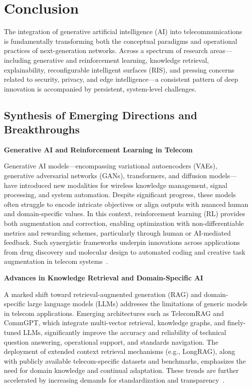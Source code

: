 \section{Conclusion}

The integration of generative artificial intelligence (AI) into telecommunications is fundamentally transforming both the conceptual paradigms and operational practices of next-generation networks. Across a spectrum of research areas—including generative and reinforcement learning, knowledge retrieval, explainability, reconfigurable intelligent surfaces (RIS), and pressing concerns related to security, privacy, and edge intelligence—a consistent pattern of deep innovation is accompanied by persistent, system-level challenges.

\subsection{Synthesis of Emerging Directions and Breakthroughs}

\textbf{Generative AI and Reinforcement Learning in Telecom}

Generative AI models—encompassing variational autoencoders (VAEs), generative adversarial networks (GANs), transformers, and diffusion models—have introduced new modalities for wireless knowledge management, signal processing, and system automation. Despite significant progress, these models often struggle to encode intricate objectives or align outputs with nuanced human and domain-specific values. In this context, reinforcement learning (RL) provides both augmentation and correction, enabling optimization with non-differentiable metrics and rewarding schemes, particularly through human or AI-mediated feedback. Such synergistic frameworks underpin innovations across applications from drug discovery and molecular design to automated coding and creative task augmentation in telecom systems~\cite{ref1, ref2, ref3, ref4, ref5, ref6}.

\textbf{Advances in Knowledge Retrieval and Domain-Specific AI}

A marked shift toward retrieval-augmented generation (RAG) and domain-specific large language models (LLMs) addresses the limitations of generic models in telecom applications. Emerging architectures such as TelecomRAG and CommGPT, which integrate multi-vector retrieval, knowledge graphs, and finely-tuned LLMs, significantly improve the accuracy and reliability of technical question answering, operational support, and standards navigation. The deployment of extended context retrieval mechanisms (e.g., LongRAG), along with publicly available telecom-specific datasets and benchmarks, emphasizes the need for domain knowledge and continual adaptation. These trends are further accelerated by increasing demands for standardization and transparency~\cite{ref13, ref14, ref15, ref16, ref17, ref18, ref19, ref20}.

